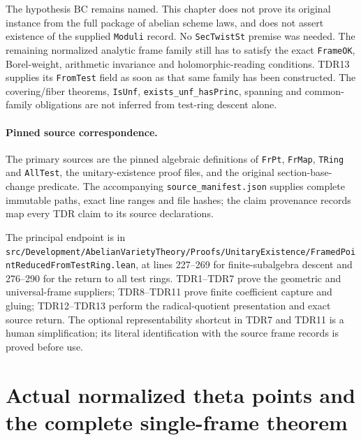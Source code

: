 \documentclass[11pt,a4paper]{article}
\numberwithin{equation}{section}
\theoremstyle{remark}\newtheorem{remark}[theorem]{Remark}
\begin{document}
The hypothesis \(\mathrm{BC}\) remains named.  This chapter does
not prove its original instance from the full package of abelian
scheme laws, and does not assert existence of the supplied
\texttt{Moduli} record.  No \texttt{Sec\allowbreak Twist\allowbreak St} premise was needed.
The remaining normalized analytic frame family still has to
satisfy the exact \texttt{Frame\allowbreak OK}, Borel-weight, arithmetic
invariance and holomorphic-reading conditions.  TDR13 supplies its
\texttt{From\allowbreak Test} field as soon as that same family has been
constructed.  The covering/fiber theorems, \texttt{Is\allowbreak Unf},
\texttt{exists\_\allowbreak unf\_\allowbreak has\allowbreak Princ}, spanning and common-family
obligations are not inferred from test-ring descent alone.

\paragraph{Pinned source correspondence.}
The primary sources are the pinned algebraic definitions of
\texttt{Fr\allowbreak Pt}, \texttt{Fr\allowbreak Map}, \texttt{TRing} and
\texttt{All\allowbreak Test}, the unitary-existence proof files, and the
original section-base-change predicate.  The accompanying
\texttt{source\_\allowbreak manifest.\allowbreak json} supplies complete immutable paths,
exact line ranges and file hashes; the claim provenance records
map every TDR claim to its source declarations.

The principal endpoint is in
\texttt{src/\allowbreak Development/\allowbreak Abelian\allowbreak Variety\allowbreak Theory/\allowbreak Proofs/\allowbreak Unitary\allowbreak Existence/\allowbreak Framed\allowbreak Point\allowbreak Reduced\allowbreak From\allowbreak Test\allowbreak Ring.\allowbreak lean},
at lines 227--269 for finite-subalgebra descent and 276--290
for the return to all test rings.  TDR1--TDR7 prove the geometric
and universal-frame suppliers; TDR8--TDR11 prove finite coefficient
capture and gluing; TDR12--TDR13 perform the radical-quotient
presentation and exact source return.  The optional representability
shortcut in TDR7 and TDR11 is a human simplification; its literal
identification with the source frame records is proved before use.


\section{Actual normalized theta points and the complete single-frame theorem}
\label{sec:normalized-frames-v050}
\end{document}
